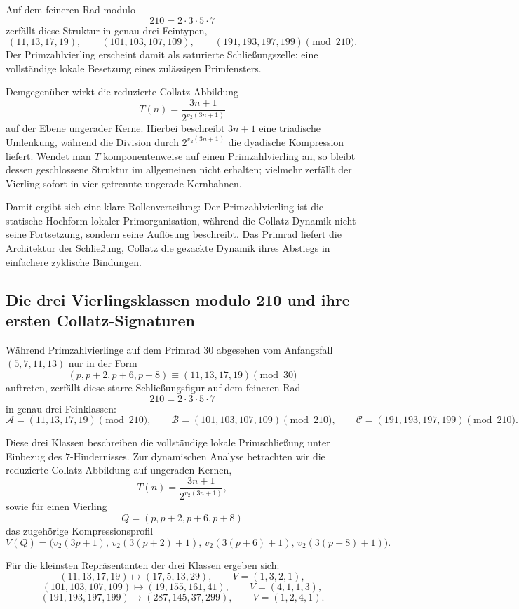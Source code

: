 \documentclass[11pt,a4paper]{article}
\theoremstyle{definition}
\begin{document}
Auf dem feineren Rad modulo
\[
210=2\cdot 3\cdot 5\cdot 7
\]
zerf\"allt diese Struktur in genau drei Feintypen,
\[
(11,13,17,19),\qquad
(101,103,107,109),\qquad
(191,193,197,199)\pmod{210}.
\]
Der Primzahlvierling erscheint damit als saturierte Schlie\ss ungszelle:
eine vollst\"andige lokale Besetzung eines zul\"assigen Primfensters.

Demgegen\"uber wirkt die reduzierte Collatz-Abbildung
\[
T(n)=\frac{3n+1}{2^{v_2(3n+1)}}
\]
auf der Ebene ungerader Kerne. Hierbei beschreibt $3n+1$ eine triadische
Umlenkung, w\"ahrend die Division durch $2^{v_2(3n+1)}$ die dyadische
Kompression liefert. Wendet man $T$ komponentenweise auf einen
Primzahlvierling an, so bleibt dessen geschlossene Struktur im allgemeinen
nicht erhalten; vielmehr zerf\"allt der Vierling sofort in vier getrennte
ungerade Kernbahnen.

Damit ergibt sich eine klare Rollenverteilung: Der Primzahlvierling ist
die statische Hochform lokaler Primorganisation, w\"ahrend die
Collatz-Dynamik nicht seine Fortsetzung, sondern seine Aufl\"osung
beschreibt. Das Primrad liefert die Architektur der Schlie\ss ung,
Collatz die gezackte Dynamik ihres Abstiegs in einfachere zyklische
Bindungen.

\subsection{Die drei Vierlingsklassen modulo 210 und ihre ersten Collatz-Signaturen}

W\"ahrend Primzahlvierlinge auf dem Primrad $30$ abgesehen vom Anfangsfall
$(5,7,11,13)$ nur in der Form
\[
(p,p+2,p+6,p+8)\equiv (11,13,17,19)\pmod{30}
\]
auftreten, zerf\"allt diese starre Schlie\ss ungsfigur auf dem feineren Rad
\[
210=2\cdot 3\cdot 5\cdot 7
\]
in genau drei Feinklassen:
\[
\mathcal A=(11,13,17,19)\pmod{210},
\qquad
\mathcal B=(101,103,107,109)\pmod{210},
\qquad
\mathcal C=(191,193,197,199)\pmod{210}.
\]

Diese drei Klassen beschreiben die vollst\"andige lokale Primschlie\ss ung
unter Einbezug des $7$-Hindernisses. Zur dynamischen Analyse betrachten wir
die reduzierte Collatz-Abbildung auf ungeraden Kernen,
\[
T(n)=\frac{3n+1}{2^{v_2(3n+1)}},
\]
sowie f\"ur einen Vierling
\[
Q=(p,p+2,p+6,p+8)
\]
das zugeh\"orige Kompressionsprofil
\[
V(Q)=\bigl(v_2(3p+1),\,v_2(3(p+2)+1),\,v_2(3(p+6)+1),\,v_2(3(p+8)+1)\bigr).
\]

F\"ur die kleinsten Repr\"asentanten der drei Klassen ergeben sich:
\[
(11,13,17,19)\mapsto (17,5,13,29),
\qquad
V=(1,3,2,1),
\]
\[
(101,103,107,109)\mapsto (19,155,161,41),
\qquad
V=(4,1,1,3),
\]
\[
(191,193,197,199)\mapsto (287,145,37,299),
\qquad
V=(1,2,4,1).
\]
\end{document}
